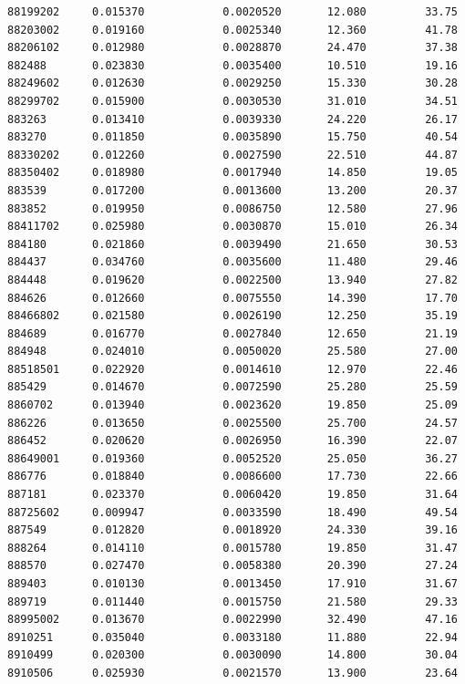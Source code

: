 \documentclass[
  letterpaper,
  DIV=11,
  numbers=noendperiod]{scrartcl}
\begin{document}
\begin{verbatim}
88199202     0.015370            0.0020520       12.080         33.75
88203002     0.019160            0.0025340       12.360         41.78
88206102     0.012980            0.0028870       24.470         37.38
882488       0.023830            0.0035400       10.510         19.16
88249602     0.012630            0.0029250       15.330         30.28
88299702     0.015900            0.0030530       31.010         34.51
883263       0.013410            0.0039330       24.220         26.17
883270       0.011850            0.0035890       15.750         40.54
88330202     0.012260            0.0027590       22.510         44.87
88350402     0.018980            0.0017940       14.850         19.05
883539       0.017200            0.0013600       13.200         20.37
883852       0.019950            0.0086750       12.580         27.96
88411702     0.025980            0.0030870       15.010         26.34
884180       0.021860            0.0039490       21.650         30.53
884437       0.034760            0.0035600       11.480         29.46
884448       0.019620            0.0022500       13.940         27.82
884626       0.012660            0.0075550       14.390         17.70
88466802     0.021580            0.0026190       12.250         35.19
884689       0.016770            0.0027840       12.650         21.19
884948       0.024010            0.0050020       25.580         27.00
88518501     0.022920            0.0014610       12.970         22.46
885429       0.014670            0.0072590       25.280         25.59
8860702      0.013940            0.0023620       19.850         25.09
886226       0.013650            0.0025500       25.700         24.57
886452       0.020620            0.0026950       16.390         22.07
88649001     0.019360            0.0052520       25.050         36.27
886776       0.018840            0.0086600       17.730         22.66
887181       0.023370            0.0060420       19.850         31.64
88725602     0.009947            0.0033590       18.490         49.54
887549       0.012820            0.0018920       24.330         39.16
888264       0.014110            0.0015780       19.850         31.47
888570       0.027470            0.0058380       20.390         27.24
889403       0.010130            0.0013450       17.910         31.67
889719       0.011440            0.0015750       21.580         29.33
88995002     0.013670            0.0022990       32.490         47.16
8910251      0.035040            0.0033180       11.880         22.94
8910499      0.020300            0.0030090       14.800         30.04
8910506      0.025930            0.0021570       13.900         23.64

\end{verbatim}
\end{document}
